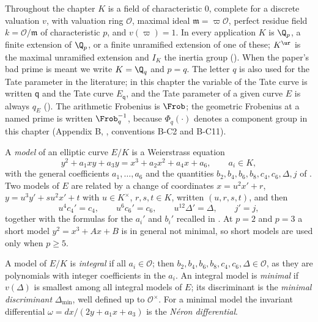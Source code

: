 \begin{convention}\label{conv:reduction:local}
Throughout the chapter $K$ is a field of characteristic $0$, complete for a discrete valuation $v$, with
valuation ring $\mathcal O$, maximal ideal $\mathfrak m=\varpi\mathcal O$, perfect residue field $k=\mathcal O/\mathfrak m$ of
characteristic $p$, and $v(\varpi)=1$. In every application $K$ is $\Q_p$, a finite extension of $\Q_p$, or a
finite unramified extension of one of these; $K^{\ur}$ is the maximal unramified extension and $I_K$ the
inertia group (). When the paper's bad prime is meant we write $K=\Q_q$ and $p=q$. The letter
$q$ is also used for the Tate parameter in the literature; in this chapter the variable of the Tate curve is
written $\mathsf q$ and the Tate curve $E_{\mathsf q}$, and the Tate parameter of a given curve $E$ is always
$q_E$ (). The arithmetic Frobenius is $\Frob$; the geometric Frobenius at a named
prime is written $\Frob_q^{-1}$, because $\Phi_q(\cdot)$ denotes a component group in this chapter (Appendix B,
, conventions B-C2 and B-C11).
\end{convention}

\begin{convention}[models]\label{conv:reduction:models}
A \emph{model} of an elliptic curve $E/K$ is a Weierstrass equation
\[
y^2+a_1xy+a_3y=x^3+a_2x^2+a_4x+a_6,\qquad a_i\in K,
\]
with the general coefficients $a_1,\dots,a_6$ and the quantities $b_2,b_4,b_6,b_8,c_4,c_6,\Delta,j$ of
. Two models of $E$ are related by a change of coordinates
$x=u^2x'+r$, $y=u^3y'+su^2x'+t$ with $u\in K^\times$, $r,s,t\in K$, written $(u,r,s,t)$, and then
\[
u^4c_4'=c_4,\qquad u^6c_6'=c_6,\qquad u^{12}\Delta'=\Delta,\qquad j'=j,
\]
together with the formulas for the $a_i'$ and $b_i'$ recalled in . At $p=2$ and $p=3$ a
short model $y^2=x^3+Ax+B$ is in general not minimal, so short models are used only when $p\ge5$.
\end{convention}

\begin{definition}\label{def:reduction:minimal}
A model of $E/K$ is \emph{integral} if all $a_i\in\mathcal O$; then $b_2,b_4,b_6,b_8,c_4,c_6,\Delta\in\mathcal O$, as they
are polynomials with integer coefficients in the $a_i$. An integral model is \emph{minimal} if $v(\Delta)$ is
smallest among all integral models of $E$; its discriminant is the \emph{minimal discriminant}
$\Delta_{\min}$, well defined up to $\mathcal O^\times$. For a minimal model the invariant differential
$\omega=dx/(2y+a_1x+a_3)$ is the \emph{N\'eron differential}.
\end{definition}

